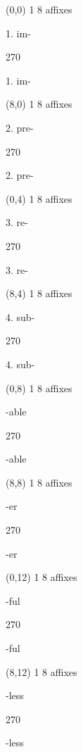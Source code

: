\documentclass[a4paper]{article}
\newenvironment{itemize*}%
{\begin{itemize}%
 \setlength{\itemsep}{0.5cm}%
 \setlength{\parsep}{0pt}%
 \setlength{\parskip}{0pt}}%
{\end{itemize}}
\newcommand{\mycard}[3]{%
	\small #1 #2
	\par
	\parbox[t][6.8cm][c]{9.5cm}{%
	\par
	\myleft{#3}
	\par
	\myright{#3}
	}
}
\newcommand{\myleft}[1]{%
	\begin{sideways}
	\hspace*{-0.9cm}
		\parbox[t][2.7cm][t]{6.5cm}{%
		\Huge #1
		}
	\end{sideways}
}
\newcommand{\myright}[1]{%
	\hspace*{6.5cm}
	\begin{turn}{270}
	\hspace*{-7.1cm}
		\parbox[t][2.7cm][t]{6.5cm}{%
		\Huge #1
		}
	\end{turn}
}
\begin{document}
\begin{textblock}{8}(0,0)
\mycard{1}{8 affixes}{
\begin{itemize*}
\item \hspace{1cm} 1. im-
\end{itemize*}
}
\end{textblock}

\begin{textblock}{8}(8,0)
\mycard{1}{8 affixes}{
\begin{itemize*}
\item \hspace{1cm} 2. pre-
\end{itemize*}
}
\end{textblock}

\begin{textblock}{8}(0,4)
\mycard{1}{8 affixes}{
\begin{itemize*}
\item \hspace{1cm} 3. re-
\end{itemize*}
}
\end{textblock}

\begin{textblock}{8}(8,4)
\mycard{1}{8 affixes}{
\begin{itemize*}
\item \hspace{1cm} 4. sub-
\end{itemize*}
}
\end{textblock}

\begin{textblock}{8}(0,8)
\mycard{1}{8 affixes}{
\begin{itemize*}
\item \hspace{1cm} -able
\end{itemize*}
}
\end{textblock}

\begin{textblock}{8}(8,8)
\mycard{1}{8 affixes}{
\begin{itemize*}
\item \hspace{1cm} -er
\end{itemize*}
}
\end{textblock}

\begin{textblock}{8}(0,12)
\mycard{1}{8 affixes}{
\begin{itemize*}
\item \hspace{1cm} -ful
\end{itemize*}
}
\end{textblock}

\begin{textblock}{8}(8,12)
\mycard{1}{8 affixes}{
\begin{itemize*}
\item \hspace{1cm} -less
\end{itemize*}
}
\end{textblock}

\null
\newpage
\end{document}
